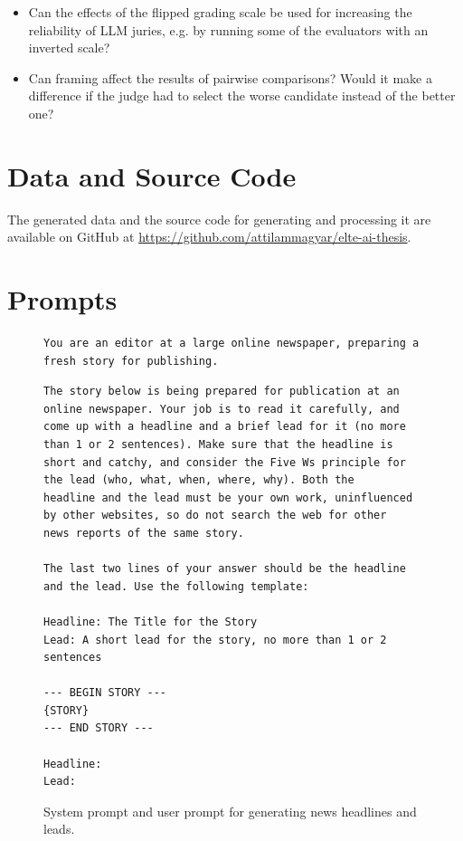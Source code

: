 \documentclass[UTF8,noindent,nohyp,parspace,titlepage,twoside,12pt]{article}
\begin{document}
      \begin{itemize}
        \item Can the effects of the flipped grading scale be used for
              increasing the reliability of LLM juries, e.g. by running some of
              the evaluators with an inverted scale?

        \item Can framing affect the results of pairwise comparisons? Would it
              make a difference if the judge had to select the worse candidate
              instead of the better one?
      \end{itemize}

\clearpage

  \appendix

  \section{Data and Source Code}

    The generated data and the source code for generating and processing it
    are available on GitHub at \url{https://github.com/attilammagyar/elte-ai-thesis}.

\clearpage

  \section{Prompts}

    \begin{figure}[hbtp]
      \begin{lstlisting}[basicstyle=\tiny\sffamily,frame=single,linewidth=\textwidth]
You are an editor at a large online newspaper, preparing a fresh story for publishing.
      \end{lstlisting}
      \begin{lstlisting}[basicstyle=\tiny\sffamily,frame=single,linewidth=\textwidth]
The story below is being prepared for publication at an online newspaper. Your job is to read it carefully, and
come up with a headline and a brief lead for it (no more than 1 or 2 sentences). Make sure that the headline is
short and catchy, and consider the Five Ws principle for the lead (who, what, when, where, why). Both the
headline and the lead must be your own work, uninfluenced by other websites, so do not search the web for other
news reports of the same story.

The last two lines of your answer should be the headline and the lead. Use the following template:

Headline: The Title for the Story
Lead: A short lead for the story, no more than 1 or 2 sentences

--- BEGIN STORY ---
{STORY}
--- END STORY ---

Headline:
Lead:
      \end{lstlisting}
      \caption{%
        System prompt and user prompt for generating news headlines and leads.
      }
      \label{figgennews}
    \end{figure}
\end{document}

